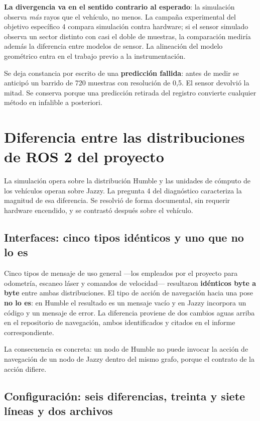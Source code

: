 \documentclass[12pt,letterpaper]{article}
\begin{document}
\textbf{La divergencia va en el sentido contrario al esperado}: la simulación observa \emph{más} rayos que el vehículo, no menos. La campaña experimental del objetivo específico 4 compara simulación contra hardware; si el sensor simulado observa un sector distinto con casi el doble de muestras, la comparación mediría además la diferencia entre modelos de sensor. La alineación del modelo geométrico entra en el trabajo previo a la instrumentación.

Se deja constancia por escrito de una \textbf{predicción fallida}: antes de medir se anticipó un barrido de 720 muestras con resolución de 0,5\textdegree. El sensor devolvió la mitad. Se conserva porque una predicción retirada del registro convierte cualquier método en infalible a posteriori.

\section{Diferencia entre las distribuciones de ROS 2 del proyecto}
\label{sec:jazzy}

La simulación opera sobre la distribución Humble y las unidades de cómputo de los vehículos operan sobre Jazzy. La pregunta 4 del diagnóstico caracteriza la magnitud de esa diferencia. Se resolvió de forma documental, sin requerir hardware encendido, y se contrastó después sobre el vehículo.

\subsection{Interfaces: cinco tipos idénticos y uno que no lo es}

Cinco tipos de mensaje de uso general ---los empleados por el proyecto para odometría, escaneo láser y comandos de velocidad--- resultaron \textbf{idénticos byte a byte} entre ambas distribuciones. El tipo de acción de navegación hacia una pose \textbf{no lo es}: en Humble el resultado es un mensaje vacío y en Jazzy incorpora un código y un mensaje de error. La diferencia proviene de dos cambios aguas arriba en el repositorio de navegación, ambos identificados y citados en el informe correspondiente.

La consecuencia es concreta: un nodo de Humble no puede invocar la acción de navegación de un nodo de Jazzy dentro del mismo grafo, porque el contrato de la acción difiere.

\subsection{Configuración: seis diferencias, treinta y siete líneas y dos archivos}
\end{document}
